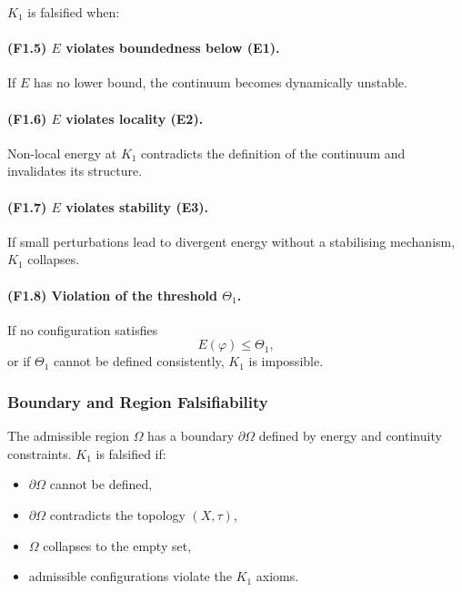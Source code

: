 $K_1$ is falsified when:

\paragraph{(F1.5) \texorpdfstring{$E$}{E} violates boundedness below (E1).}
If $E$ has no lower bound, the continuum becomes dynamically unstable.

\paragraph{(F1.6) \texorpdfstring{$E$}{E} violates locality (E2).}
Non-local energy at $K_1$ contradicts the definition of the continuum and
invalidates its structure.

\paragraph{(F1.7) \texorpdfstring{$E$}{E} violates stability (E3).}
If small perturbations lead to divergent energy without a stabilising
mechanism, $K_1$ collapses.

\paragraph{(F1.8) Violation of the threshold \texorpdfstring{$\Theta_1$}{\Theta_1}.}
If no configuration satisfies
\[
E(\varphi) \le \Theta_1,
\]
or if $\Theta_1$ cannot be defined consistently, $K_1$ is impossible.



\subsubsection{Boundary and Region Falsifiability}

The admissible region $\Omega$ has a boundary $\partial\Omega$ defined by
energy and continuity constraints.
$K_1$ is falsified if:

\begin{itemize}
    \item $\partial\Omega$ cannot be defined,
    \item $\partial\Omega$ contradicts the topology $(X,\tau)$,
    \item $\Omega$ collapses to the empty set,
    \item admissible configurations violate the $K_1$ axioms.
\end{itemize}

